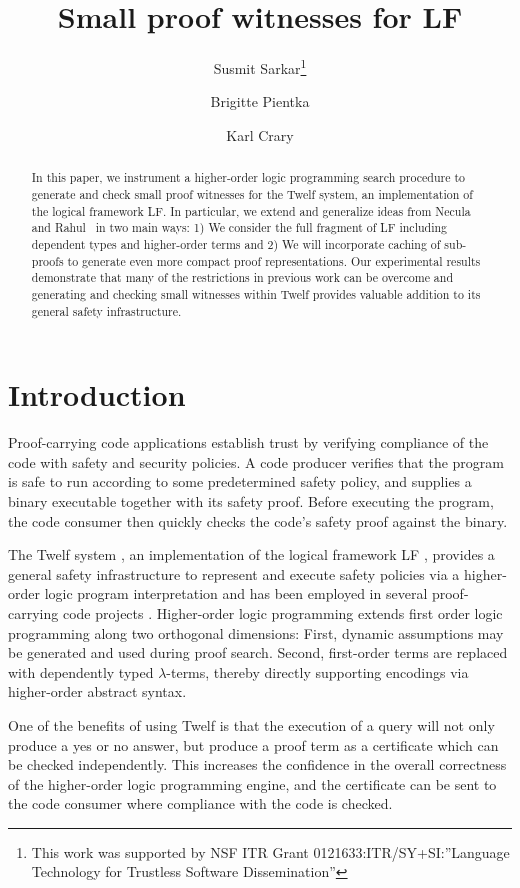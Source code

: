 \documentclass{llncs}
\title{Small proof witnesses for LF}
\author{
Susmit Sarkar\inst{1}\thanks{This work was supported by NSF ITR Grant 0121633:ITR/SY+SI:''Language Technology for Trustless Software Dissemination''}
\and Brigitte Pientka\inst{2}
\and Karl Crary\inst{1}}%
\institute{%
Carnegie Mellon University, Pittsburgh, USA
\and McGill University, Montr\'eal, Canada
}
\date{}
\begin{document}
\maketitle 

\begin{abstract}
In this paper, we instrument a higher-order logic programming
search procedure to generate and check small proof witnesses for
the Twelf system, an implementation of the logical framework LF. In
particular, we extend and generalize ideas from Necula and
Rahul~\cite{Necula+01:oracle} in two main ways: 1) We consider the 
full fragment of LF including dependent types and higher-order terms
and 2) We will incorporate caching of sub-proofs to generate even more
compact proof representations. Our experimental results  demonstrate
that many of the restrictions in previous work can be overcome and
generating and checking small witnesses within Twelf provides valuable
addition to its general safety infrastructure.
\end{abstract}

\section{Introduction}
Proof-carrying code applications establish trust by verifying
compliance of the code with safety and security policies.
A code producer verifies that the program is safe to
run according to some predetermined safety policy, and supplies a
binary executable together with its safety proof. Before
executing the program, the code consumer then quickly checks the code's
safety proof against the binary. 

The Twelf system \cite{Pfenning99cade}, an implementation of the logical framework LF \cite{Harper93jacm}, provides a general safety
infrastructure to represent and execute safety policies via a
higher-order logic program interpretation and has been employed in
several proof-carrying code projects
\cite{AppelFelty00,Crary:POPL03,AppelFelten99,Crary:CADE03}.   
Higher-order logic programming extends first order logic
programming along two orthogonal dimensions: First, dynamic assumptions
may be generated and used during proof search. Second, first-order terms
are replaced with dependently typed $\lambda$-terms, thereby
directly supporting encodings via higher-order abstract
syntax. 

One of the benefits of using Twelf is that the
execution of a query will not only produce a yes or no answer, but
produce a proof term as a certificate which can be checked independently. 
This increases the confidence in the overall correctness of the
higher-order logic programming engine, and the certificate can
be sent to the code consumer where compliance with the code is
checked. 
\end{document}
